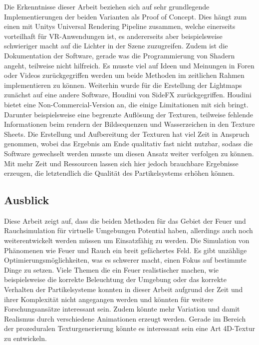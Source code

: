 Die Erkenntnisse dieser Arbeit beziehen sich auf sehr grundlegende Implementierungen der beiden Varianten als Proof of Concept. Dies hängt zum einen mit 
Unitys Universal Rendering Pipeline zusammen, welche einerseits vorteilhaft für VR-Anwendungen ist, es andererseits aber beispielsweise schwieriger macht
auf die Lichter in der Szene zuzugreifen. Zudem ist die Dokumentation der Software, gerade was die Programmierung von Shadern angeht, teilweise nicht hilfreich. 
Es musste viel auf Ideen und Meinungen in Foren oder Videos zurückgegriffen werden um beide Methoden im zeitlichen Rahmen implementieren zu können. 
Weiterhin wurde für die Erstellung der Lightmaps zunächst auf eine andere Software, Houdini von SideFX zurückgegriffen.
Houdini bietet eine Non-Commercial-Version an, die einige Limitationen mit sich bringt. Darunter beispielsweise eine begrenzte Auflösung der Texturen, 
teilweise fehlende Informationen beim rendern der Bildsequenzen und Wasserzeichen in den Texture Sheets. Die Erstellung und Aufbereitung der Texturen hat viel Zeit
in Anspruch genommen, wobei das Ergebnis am Ende qualitativ fast nicht nutzbar, sodass die Software gewechselt werden musste um diesen Ansatz weiter verfolgen zu können.
Mit mehr Zeit und Ressourcen lassen sich hier jedoch brauchbare Ergebnisse erzeugen, die letztendlich die Qualität des Partikelsystems erhöhen können. 



\subsection{Ausblick}
\label{sec:6.3}
Diese Arbeit zeigt auf, dass die beiden Methoden für das Gebiet der Feuer und Rauchsimulation für virtuelle Umgebungen Potential haben, allerdings auch noch 
weiterentwickelt werden müssen um Einsatzfähig zu werden.   
Die Simulation von Phänomenen wie Feuer und Rauch ein breit gefächertes Feld. Es gibt unzählige Optimierungsmöglichkeiten, was es schwerer macht, einen Fokus auf
bestimmte Dinge zu setzen. Viele Themen die ein Feuer realistischer machen, wie beispielsweise die korrekte Beleuchtung der Umgebung oder das korrekte Verhalten 
der Partikelsysteme konnten in dieser Arbeit aufgrund der Zeit und ihrer Komplexität nicht angegangen werden und könnten für weitere Forschungsansätze interessant sein. 
Zudem könnte mehr Variation und damit Realismus durch verschiedene Animationen erzeugt werden. Gerade im Bereich der prozeduralen Texturgenerierung könnte es interessant
sein eine Art 4D-Textur zu entwickeln.

\newpage
